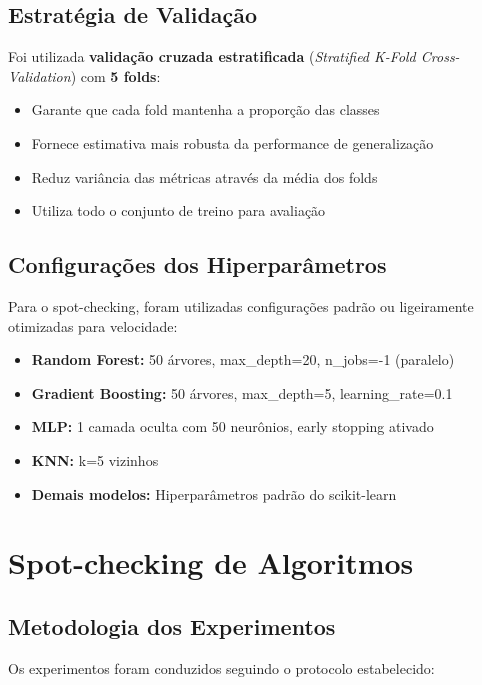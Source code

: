 \documentclass[12pt,a4paper]{article}
\begin{document}
\subsection{Estratégia de Validação}

Foi utilizada \textbf{validação cruzada estratificada} (\textit{Stratified K-Fold Cross-Validation}) com \textbf{5 folds}:

\begin{itemize}
    \item Garante que cada fold mantenha a proporção das classes
    \item Fornece estimativa mais robusta da performance de generalização
    \item Reduz variância das métricas através da média dos folds
    \item Utiliza todo o conjunto de treino para avaliação
\end{itemize}

\subsection{Configurações dos Hiperparâmetros}

Para o spot-checking, foram utilizadas configurações padrão ou ligeiramente otimizadas para velocidade:

\begin{itemize}
    \item \textbf{Random Forest:} 50 árvores, max\_depth=20, n\_jobs=-1 (paralelo)
    \item \textbf{Gradient Boosting:} 50 árvores, max\_depth=5, learning\_rate=0.1
    \item \textbf{MLP:} 1 camada oculta com 50 neurônios, early stopping ativado
    \item \textbf{KNN:} k=5 vizinhos
    \item \textbf{Demais modelos:} Hiperparâmetros padrão do scikit-learn
\end{itemize}

\section{Spot-checking de Algoritmos}

\subsection{Metodologia dos Experimentos}

Os experimentos foram conduzidos seguindo o protocolo estabelecido:
\end{document}
